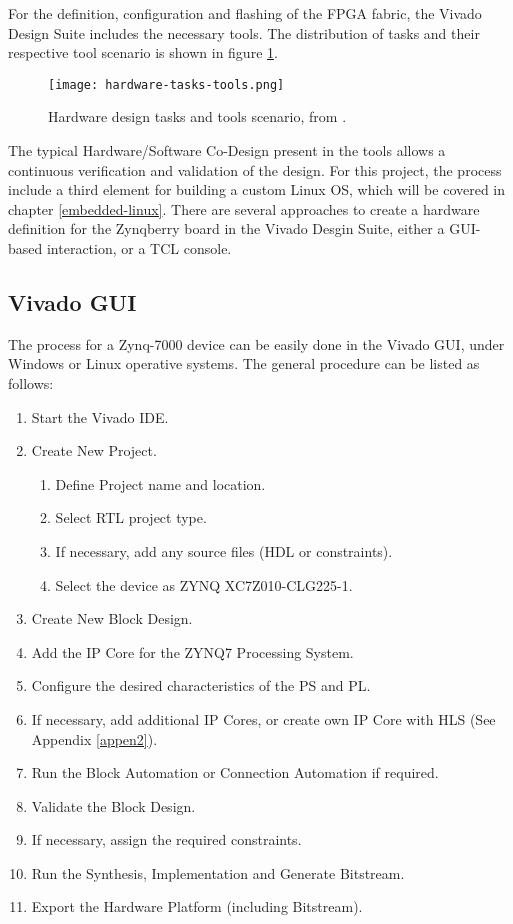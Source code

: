 For the definition, configuration and flashing of the FPGA fabric, the Vivado Design Suite includes
the necessary tools. The distribution of tasks and their respective tool scenario is shown in figure
\ref{fig:hardware-tasks-tools}.

\begin{figure}[htp]
	\centering
	\texttt{[image: hardware-tasks-tools.png]}
	\caption{Hardware design tasks and tools scenario, from \cite{UG1043}.}
	\label{fig:hardware-tasks-tools}
\end{figure}%

The typical Hardware/Software Co-Design present in the tools allows a continuous verification and
validation of the design. For this project, the process include a third element for building a
custom Linux OS, which will be covered in chapter \ref{embedded-linux}. There are several approaches
to create a hardware definition for the Zynqberry board in the Vivado Desgin Suite, either a
GUI-based interaction, or a TCL console.

\subsection{Vivado GUI}

The process for a Zynq-7000 device can be easily done in the Vivado GUI, under Windows or Linux
operative systems. The general procedure can be listed as follows:

\begin{enumerate}
	\item Start the Vivado IDE.
	\item Create New Project.
	\begin{enumerate}
		\item Define Project name and location.
		\item Select RTL project type.
		\item If necessary, add any source files (HDL or constraints).
		\item Select the device as ZYNQ XC7Z010-CLG225-1.
	\end{enumerate}
	\item Create New Block Design.
	\item Add the IP Core for the ZYNQ7 Processing System.
	\item Configure the desired characteristics of the PS and PL.
	\item If necessary, add additional IP Cores, or create own IP Core with HLS (See Appendix
	\ref{appen2}).
	\item Run the Block Automation or Connection Automation if required.
	\item Validate the Block Design.
	\item If necessary, assign the required constraints.
	\item Run the Synthesis, Implementation and Generate Bitstream.
	\item Export the Hardware Platform (including Bitstream).
\end{enumerate}

